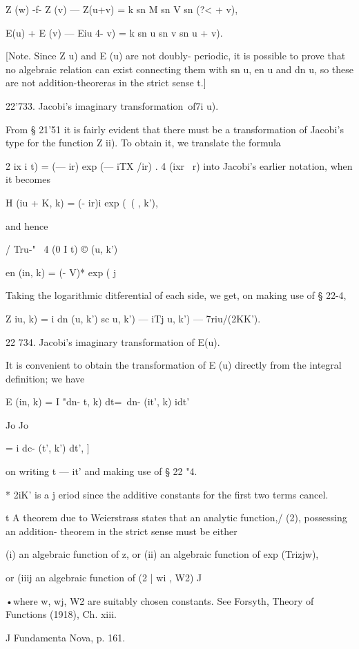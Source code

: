 Z (w) -f- Z (v) — Z(u+v) = k sn M sn V sn (?< + v),

E(u) + E (v) — Eiu 4- v) = k sn u sn v sn u + v).

[Note. Since Z u) and E (u) are not doubly- periodic, it is possible
to prove that no algebraic relation can exist connecting them with sn
u, en u and dn u, so these are not addition-theoreras in the strict
sense t.]

22'733. Jacobi's imaginary transformation\ of7i u).

From § 21'51 it is fairly evident that there must be a transformation
of Jacobi's type for the function Z ii). To obtain it, we translate
the formula

 2 ix i t) = (— ir) exp (— iTX /ir) . 4 (ixr \ r) into Jacobi's
earlier notation, when it becomes

H (iu + K, k) = (- ir)i exp (\ ( , k'),

and hence

/ Tru-" \ 4 (0 I t) © (u, k')

en (in, k) = (- V)* exp ( j

Taking the logarithmic ditferential of each side, we get, on making
use of § 22-4,

Z iu, k) = i dn (u, k') sc u, k') — iTj u, k') — 7riu/(2KK').

22 734. Jacobi's imaginary transformation of E(u).

It is convenient to obtain the transformation of E (u) directly from
the integral definition; we have

E (in, k) = I "dn- t, k) dt=\ dn- (it', k) idt'

Jo Jo

= i dc- (t', k') dt', ]

on writing t — it' and making use of § 22 "4.

* 2iK' is a j eriod since the additive constants for the first two
terms cancel.

t A theorem due to Weierstrass states that an analytic function,/ (2),
possessing an addition- theorem in the strict sense must be either

(i) an algebraic function of z, or (ii) an algebraic function of exp
(Trizjw),

or (iiij an algebraic function of (2 | wi , W2) J

•where w, wj, W2 are suitably chosen constants. See Forsyth, Theory of
Functions (1918), Ch. xiii.

J Fundamenta Nova, p. 161.

